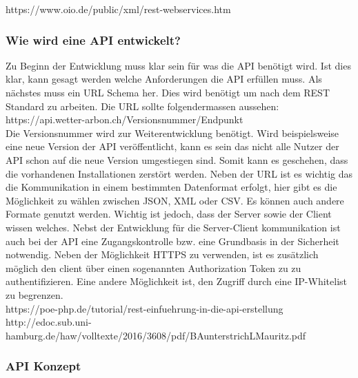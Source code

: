 https://www.oio.de/public/xml/rest-webservices.htm

\subsubsection{Wie wird eine API entwickelt?}
Zu Beginn der Entwicklung muss klar sein für was die API benötigt wird. Ist dies klar, kann gesagt werden welche Anforderungen die API erfüllen muss. Als nächstes muss ein URL Schema her. Dies wird benötigt um nach dem REST Standard zu arbeiten. Die URL sollte folgendermassen aussehen: \\ https://api.wetter-arbon.ch/Versionsnummer/Endpunkt\\
Die Versionsnummer wird zur Weiterentwicklung benötigt. Wird beispielsweise eine neue Version der API veröffentlicht, kann es sein das nicht alle Nutzer der API schon auf die neue Version umgestiegen sind. Somit kann es geschehen, dass die vorhandenen Installationen zerstört werden. Neben der URL ist es wichtig das die Kommunikation in einem bestimmten Datenformat erfolgt, hier gibt es die Möglichkeit zu wählen zwischen JSON, XML oder CSV. Es können auch andere Formate genutzt werden. Wichtig ist jedoch, dass der Server sowie der Client wissen welches. Nebst der Entwicklung für die Server-Client kommunikation ist auch bei der API eine Zugangskontrolle bzw. eine Grundbasis in der Sicherheit notwendig. Neben der Möglichkeit HTTPS zu verwenden, ist es zusätzlich möglich den client über einen sogenannten Authorization Token zu zu authentifizieren. Eine andere Möglichkeit ist, den Zugriff durch eine IP-Whitelist zu begrenzen. \\

https://poe-php.de/tutorial/rest-einfuehrung-in-die-api-erstellung\\
http://edoc.sub.uni-hamburg.de/haw/volltexte/2016/3608/pdf/BAunterstrichLMauritz.pdf\\

\subsubsection{API Konzept}

